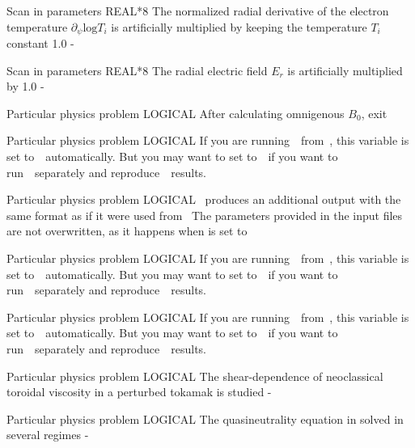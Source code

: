 {Scan in parameters}
{REAL*8}
{The normalized radial derivative of the electron temperature $\partial_\psi\mathrm{log}T_i$ is artificially multiplied by  keeping the temperature $T_i$ constant}
{1.0}
{-}
{}

{Scan in parameters}
{REAL*8}
{The radial electric field $E_r$ is artificially multiplied by }
{1.0}
{-}
{}

{Particular physics problem}
{LOGICAL}
{After calculating omnigenous $B_0$, exit}
{\false}
{}
{\citep{landreman2012omni,parra2015omni}

{Particular physics problem}
{LOGICAL}
{}
{\false}
{If you are running~\KNOSOS~from~\TASKTD, this variable is set to~\true~automatically. But you may want to set  to~\true~if you want to run~\KNOSOS~separately and reproduce~\TASKTD~results.}
{\citep{yokoyama2017task3d}}

{Particular physics problem}
{LOGICAL}
{\KNOSOS~produces an additional output with the same format as if it were used from~\TASKTD}
{\false}
{The parameters provided in the input files are not overwritten, as it happens when  is set to~\true}
{}

{Particular physics problem}
{LOGICAL}
{}
{\false}
{If you are running~\KNOSOS~from~\PENTA, this variable is set to~\true~automatically. But you may want to set  to~\true~if you want to run~\KNOSOS~separately and reproduce~\PENTA~results.}
{\citep{spong2005flow}}

{Particular physics problem}
{LOGICAL}
{}
{\false}
{If you are running~\KNOSOS~from~\NEOTRANSP, this variable is set to~\true~automatically. But you may want to set  to~\true~if you want to run~\KNOSOS~separately and reproduce~\NEOTRANSP~results.}
{}

{Particular physics problem}
{LOGICAL}
{The shear-dependence of neoclassical toroidal viscosity in a perturbed tokamak is studied}
{\false}
{-}
{\citep{satake2018iaea}}


{Particular physics problem}
{LOGICAL}
{The quasineutrality equation in solved in several regimes}
{\false}
{-}
{\citep{calvo2018jpp}}


}
